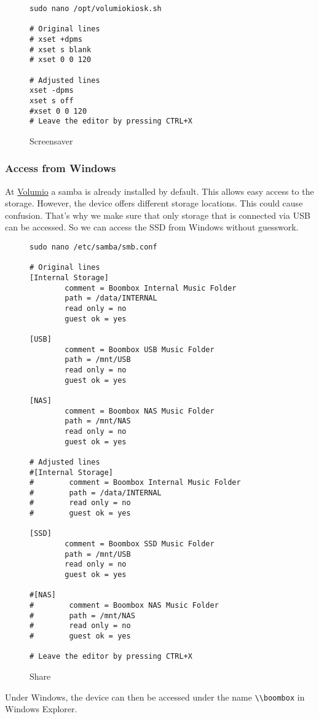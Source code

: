 \documentclass[12pt,a4paper]{article}
\newcommand{\code}[1]{\texttt{#1}}
\newcommand{\vol}{\href{https://volumio.org/}{Volumio}\index{Volumio}}
\begin{document}
\begin{figure}[H]
\begin{lstlisting}
sudo nano /opt/volumiokiosk.sh

# Original lines
# xset +dpms
# xset s blank
# xset 0 0 120

# Adjusted lines
xset -dpms
xset s off
#xset 0 0 120
# Leave the editor by pressing CTRL+X
\end{lstlisting}
\caption{Screensaver}\label{fig:Screensaver}
\end{figure}

\subsubsection{Access from Windows}
At \vol{} a samba is already installed by default. This allows easy access to the storage. However, the device offers different storage locations. This could
cause confusion. That's why we make sure that only storage that is connected via USB can be accessed. So we can access the SSD from Windows without guesswork.

\begin{figure}[H]
\begin{lstlisting}
sudo nano /etc/samba/smb.conf

# Original lines
[Internal Storage]
        comment = Boombox Internal Music Folder
        path = /data/INTERNAL
        read only = no
        guest ok = yes

[USB]
        comment = Boombox USB Music Folder
        path = /mnt/USB
        read only = no
        guest ok = yes

[NAS]
        comment = Boombox NAS Music Folder
        path = /mnt/NAS
        read only = no
        guest ok = yes

# Adjusted lines
#[Internal Storage]
#        comment = Boombox Internal Music Folder
#        path = /data/INTERNAL
#        read only = no
#        guest ok = yes

[SSD]
        comment = Boombox SSD Music Folder
        path = /mnt/USB
        read only = no
        guest ok = yes

#[NAS]
#        comment = Boombox NAS Music Folder
#        path = /mnt/NAS
#        read only = no
#        guest ok = yes

# Leave the editor by pressing CTRL+X
\end{lstlisting}
\caption{Share}\label{fig:Share}
\end{figure}

Under Windows, the device can then be accessed under the name \code{\textbackslash{}\textbackslash{}boombox} in Windows Explorer.
\end{document}
